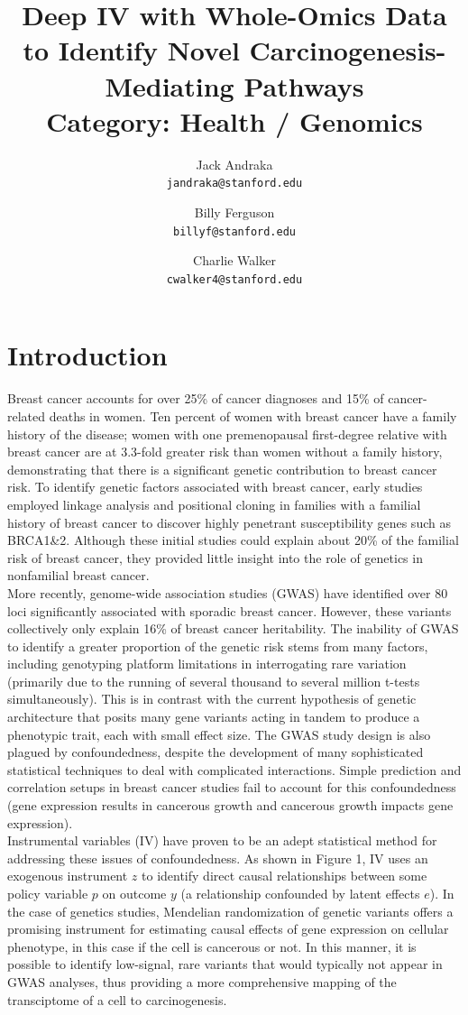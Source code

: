 \documentclass[10.5pt, oneside, twocolumn]{article}   	%
\title{Deep IV with Whole-Omics Data to Identify Novel Carcinogenesis-Mediating Pathways \\
	\vspace{3mm}
	\large Category: Health / Genomics}
\author{
	Jack Andraka\\ 
	\texttt{jandraka@stanford.edu}
	\and
	Billy Ferguson\\
	\texttt{billyf@stanford.edu}
	\and
	Charlie Walker\\
	\texttt{cwalker4@stanford.edu}
}
\date{}							%
\begin{document}
\maketitle
\section{Introduction}
Breast cancer accounts for over 25\% of cancer diagnoses and 15\% of cancer-related deaths in women.\cite{torre2016global} Ten percent of women with breast cancer have a family history of the disease; women with one premenopausal first-degree relative with breast cancer are at 3.3-fold greater risk than women without a family history, demonstrating that there is a significant genetic contribution to breast cancer risk. To identify genetic factors associated with breast cancer, early studies employed linkage analysis and positional cloning in families with a familial history of breast cancer to discover highly penetrant susceptibility genes such as BRCA1\&2.\cite{joosse2012brca1} Although these initial studies could explain about 20\% of the familial risk of breast cancer,\cite{thompson2004genetic} they provided little insight into the role of genetics in nonfamilial breast cancer. \\

More recently, genome-wide association studies (GWAS) have identified over 80 loci significantly associated with sporadic breast cancer. However, these variants collectively only explain 16\% of breast cancer heritability.\cite{skol2016genetics} The inability of GWAS to identify a greater proportion of the genetic risk stems from many factors, including genotyping platform limitations in interrogating rare variation (primarily due to the running of several thousand to several million t-tests simultaneously). This is in contrast with the current hypothesis of genetic architecture that posits many gene variants acting in tandem to produce a phenotypic trait, each with small effect size.\cite{de2010predicting} The GWAS study design is also plagued by confoundedness, despite the development of many sophisticated statistical techniques to deal with complicated interactions. Simple prediction and correlation setups in breast cancer studies fail to account for this confoundedness (gene expression results in cancerous growth and cancerous growth impacts gene expression). \\

Instrumental variables (IV) have proven to be an adept statistical method for addressing these issues of confoundedness. As shown in Figure 1, IV uses an exogenous instrument $z$ to identify direct causal relationships between some policy variable $p$ on outcome $y$ (a relationship confounded by latent effects $e$). In the case of genetics studies, Mendelian randomization of genetic variants offers a promising instrument for estimating causal effects of gene expression on cellular phenotype, in this case if the cell is cancerous or not.\cite{burgess2017dissecting} In this manner, it is possible to identify low-signal, rare variants that would typically not appear in GWAS analyses, thus providing a more comprehensive mapping of the transciptome of a cell to carcinogenesis. \\
\end{document}
